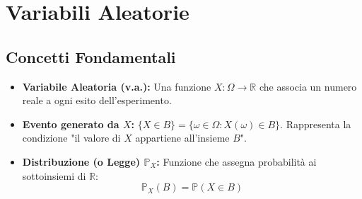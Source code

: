 \documentclass[12pt]{extarticle} %
\begin{document}
\section{Variabili Aleatorie}

\subsection{Concetti Fondamentali}
\begin{itemize}
    \item \textbf{Variabile Aleatoria (v.a.):} Una funzione $X: \Omega \to \mathbb{R}$ che associa un numero reale a ogni esito dell'esperimento.
    \item \textbf{Evento generato da $X$:} $\{X \in B\} = \{\omega \in \Omega : X(\omega) \in B\}$. Rappresenta la condizione "il valore di $X$ appartiene all'insieme $B$".
    \item \textbf{Distribuzione (o Legge) $\mathbb{P}_X$:} Funzione che assegna probabilità ai sottoinsiemi di $\mathbb{R}$:
    \begin{equation*}
        \mathbb{P}_X(B) = \mathbb{P}(X \in B)
    \end{equation*}
\end{itemize}
\end{document}
